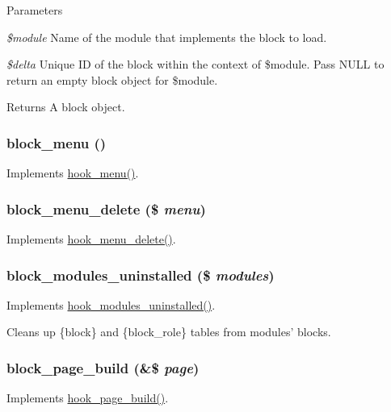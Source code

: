 \begin{DoxyParams}{Parameters}
\item[{\em \$module}]Name of the module that implements the block to load. \item[{\em \$delta}]Unique ID of the block within the context of \$module. Pass NULL to return an empty block object for \$module.\end{DoxyParams}
\begin{DoxyReturn}{Returns}
A block object. 
\end{DoxyReturn}
\hypertarget{block_8module_a4306efb2047cb30ce81f3c0907618dfd}{
\subsubsection[{block\_\-menu}]{\setlength{\rightskip}{0pt plus 5cm}block\_\-menu ()}}
\label{block_8module_a4306efb2047cb30ce81f3c0907618dfd}
Implements \hyperlink{group__hooks_ga5c95244fea59b25666e409759e133ded}{hook\_\-menu()}. \hypertarget{block_8module_a983fd0daa9cbbe841a5daedf876e4ee2}{
\subsubsection[{block\_\-menu\_\-delete}]{\setlength{\rightskip}{0pt plus 5cm}block\_\-menu\_\-delete (\$ {\em menu})}}
\label{block_8module_a983fd0daa9cbbe841a5daedf876e4ee2}
Implements \hyperlink{group__hooks_gaef8c43d600c4efbae913dc3841a93199}{hook\_\-menu\_\-delete()}. \hypertarget{block_8module_a0cbbdff96f480240a42c0951a00e52dc}{
\subsubsection[{block\_\-modules\_\-uninstalled}]{\setlength{\rightskip}{0pt plus 5cm}block\_\-modules\_\-uninstalled (\$ {\em modules})}}
\label{block_8module_a0cbbdff96f480240a42c0951a00e52dc}
Implements \hyperlink{group__hooks_ga4f29c7343438068a922459cbe0810279}{hook\_\-modules\_\-uninstalled()}.

Cleans up \{block\} and \{block\_\-role\} tables from modules' blocks. \hypertarget{block_8module_a554cfaeffe083326bc06d1c59fba4f3d}{
\subsubsection[{block\_\-page\_\-build}]{\setlength{\rightskip}{0pt plus 5cm}block\_\-page\_\-build (\&\$ {\em page})}}
\label{block_8module_a554cfaeffe083326bc06d1c59fba4f3d}
Implements \hyperlink{group__hooks_ga16d8d8ae818dc759bbe539e16ff5b93b}{hook\_\-page\_\-build()}.

